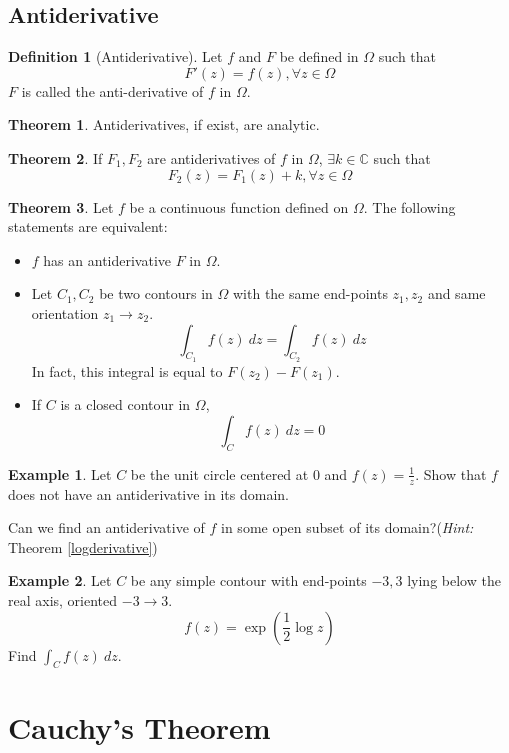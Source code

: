 \documentclass[10pt, a4paper]{extarticle}
\theoremstyle{definition}
\newtheorem{thm}{Theorem}
\newtheorem{defn}{Definition}
\newtheorem{eg}{Example}
\begin{document}
\subsection{Antiderivative}
\begin{defn}[Antiderivative]
	Let $f$ and $F$ be defined in $\Omega$ such that
	\[F'(z)=f(z),\forall z\in\Omega\]
	$F$ is called the anti-derivative of $f$ in $\Omega$.
\end{defn}

\begin{thm}
	Antiderivatives, if exist, are analytic.
\end{thm}

\begin{thm}
	If $F_1,F_2$ are antiderivatives of $f$ in $\Omega$, $\exists k\in\mathbb{C}$ such that
	\[F_2(z)=F_1(z)+k,\forall z\in\Omega\]
\end{thm}

\begin{thm}\label{conservative}
	Let $f$ be a continuous function defined on $\Omega$. The following statements are equivalent:
	\begin{itemize}
		\item $f$ has an antiderivative $F$ in $\Omega$.
		\item Let $C_1,C_2$ be two contours in $\Omega$ with the same end-points $z_1,z_2$ and same orientation $z_1\to z_2$.
		      \[\int_{C_1}f(z)\ dz=\int_{C_2}f(z)\ dz\]
		      In fact, this integral is equal to $F(z_2)-F(z_1)$.
		\item If $C$ is a closed contour in $\Omega$,
		      \[\int_Cf(z)\ dz=0\]
	\end{itemize}
\end{thm}
\begin{eg}
	Let $C$ be the unit circle centered at 0 and $f(z)=\frac{1}{z}$. Show that $f$ does not have an antiderivative in its domain.

	Can we find an antiderivative of $f$ in some open subset of its domain?(\textit{Hint: }Theorem \ref{logderivative})
\end{eg}
\begin{eg}
	Let $C$ be any simple contour with end-points $-3,3$ lying below the real axis, oriented $-3\to 3$.
	\[f(z)=\exp(\frac{1}{2}\log z)\tag*{($0<\arg z<2\pi$)}\]
	Find $\int_C f(z)\ dz$.
\end{eg}

\section{Cauchy's Theorem}
\end{document}
